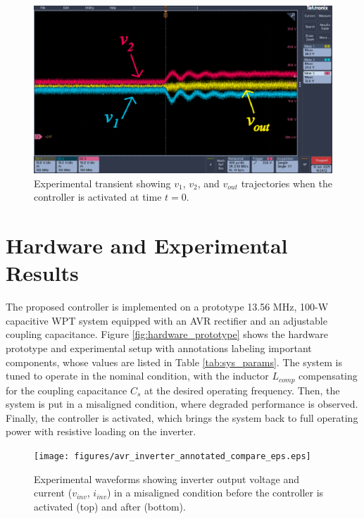 \documentclass[conference, twocolumn, letterpaper]{IEEEtran}
\begin{document}
\begin{figure}[h]
	\centering
	\includegraphics[width=\linewidth]{figures/avr_voltage_transient_annotated_eps.eps}
	\caption{Experimental transient showing $v_1$, $v_2$, and $v_{out}$ trajectories when the controller is activated at time $t = 0$.}
	\label{fig:voltage_transient}
\end{figure}

\section{Hardware and Experimental Results}
\label{sec:hardware}

The proposed controller is implemented on a prototype 13.56 MHz, 100-W capacitive WPT system equipped with an AVR rectifier and an adjustable coupling capacitance. Figure \ref{fig:hardware_prototype} shows the hardware prototype and experimental setup with annotations labeling important components, whose values are listed in Table \ref{tab:sys_params}. The system is tuned to operate in the nominal condition, with the inductor $L_{comp}$ compensating for the coupling capacitance $C_s$ at the desired operating frequency. Then, the system is put in a misaligned condition, where degraded performance is observed. Finally, the controller is activated, which brings the system back to full operating power with resistive loading on the inverter.

\begin{figure}[!ht]
	\centering
	\texttt{[image: figures/avr\_inverter\_annotated\_compare\_eps.eps]}
	\caption{Experimental waveforms showing inverter output voltage and current ($v_{inv}$, $i_{inv}$) in a misaligned condition before the controller is activated (top) and after (bottom).}
	\label{fig:inverter}
\end{figure}
\end{document}
